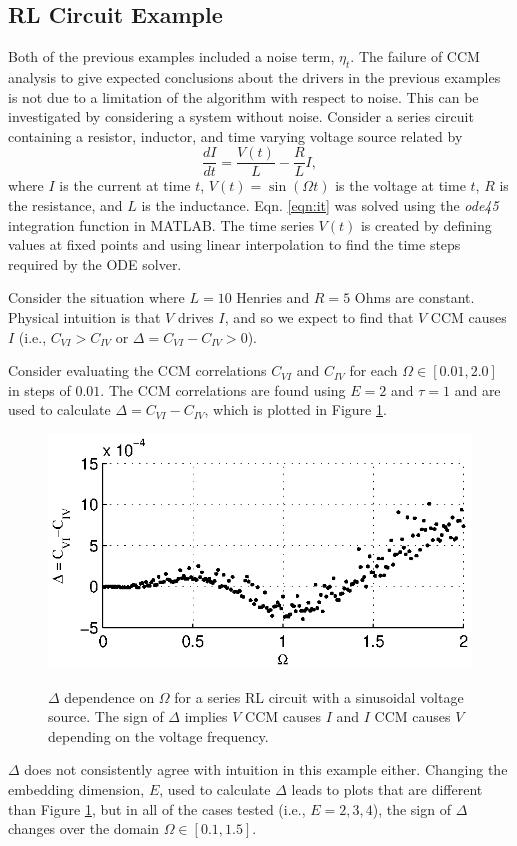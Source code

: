 \documentclass[twocolumn,aps,pre,groupedaddress]{revtex4-1}
\begin{document}
\subsection{RL Circuit Example}
\label{sec:rlcirc}
Both of the previous examples included a noise term, $\eta_t$.  The failure of CCM analysis to give expected conclusions about the drivers in the previous examples is not due to a limitation of the algorithm with respect to noise.  This can be investigated by considering a system without noise.  Consider a series circuit containing a resistor, inductor, and time varying voltage source related by
\begin{equation}
\label{eqn:it}
\frac{dI}{dt} = \frac{V(t)}{L} - \frac{R}{L} I,
\end{equation}
where $I$ is the current at time $t$, $V(t)= \sin\left(\Omega t\right)$ is the voltage at time $t$, $R$ is the resistance, and $L$ is the inductance.  Eqn. \ref{eqn:it} was solved using the {\em ode45} integration function in MATLAB.  The time series $V(t)$ is created by defining values at fixed points and using linear interpolation to find the time steps required by the ODE solver.  

Consider the situation where $L=10$ Henries and $R=5$ Ohms are constant.  Physical intuition is that $V$ drives $I$, and so we expect to find that $V$ CCM causes $I$ (i.e., $C_{VI}>C_{IV}$ or $\Delta = C_{VI}-C_{IV} > 0$). 

Consider evaluating the CCM correlations $C_{VI}$ and $C_{IV}$ for each $\Omega\in[0.01,2.0]$ in steps of $0.01$.  The CCM correlations are found using $E=2$ and $\tau=1$ and are used to calculate $\Delta = C_{VI}-C_{IV}$, which is plotted in Figure \ref{fig:Av}.
\begin{figure}[ht]
\includegraphics[scale=0.9]{RLCircuitVaryV_Freq.eps} \\
\caption{$\Delta$ dependence on $\Omega$ for a series RL circuit with a sinusoidal voltage source.  The sign of $\Delta$ implies $V$ CCM causes $I$ and $I$ CCM causes $V$ depending on the voltage frequency.}
\label{fig:Av}
\end{figure}
$\Delta$ does not consistently agree with intuition in this example either.  Changing the embedding dimension, $E$, used to calculate $\Delta$ leads to plots that are different than Figure \ref{fig:Av}, but in all of the cases tested (i.e., $E=2,3,4$), the sign of $\Delta$ changes over the domain $\Omega\in[0.1,1.5]$. 
\end{document}
